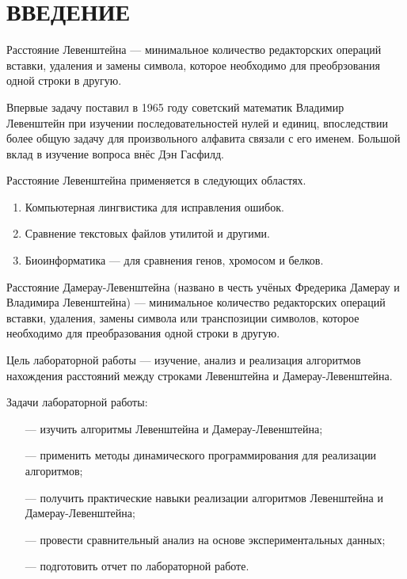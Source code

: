 \chapter*{ВВЕДЕНИЕ}

Расстояние Левенштейна --- минимальное количество редакторских операций вставки, удаления и замены символа, которое необходимо для преобрзования одной строки в другую. 

Впервые задачу поставил в 1965 году советский математик Владимир Левенштейн \cite{Levenshtein} при изучении последовательностей нулей и единиц, впоследствии более общую задачу для произвольного алфавита связали с его именем. Большой вклад в изучение вопроса внёс Дэн Гасфилд.

Расстояние Левенштейна применяется в следующих областях. 
\begin{enumerate}[label={\arabic*)}]
	\item Компьютерная лингвистика для исправления ошибок.
	\item Сравнение текстовых файлов утилитой  и  другими.
	\item Биоинформатика --- для сравнения генов, хромосом и белков.
\end{enumerate}

Расстояние Дамерау-Левенштейна (названо в честь учёных Фредерика Дамерау и Владимира Левенштейна) --- минимальное количество редакторских операций вставки, удаления, замены символа или транспозиции символов, которое необходимо для преобразования одной строки в другую.

Цель лабораторной работы --- изучение, анализ и реализация алгоритмов нахождения расстояний между строками Левенштейна и Дамерау-Левенштейна.

Задачи лабораторной работы:

\begin{itemize}
	\item[---] изучить алгоритмы Левенштейна и Дамерау-Левенштейна;
	\item[---] применить методы динамического программирования для реализации алгоритмов;
	\item[---] получить практические навыки реализации алгоритмов Левенштейна и Дамерау-Левенштейна;
	\item[---] провести сравнительный анализ на основе экспериментальных данных;
	\item[---] подготовить отчет по лабораторной работе.
\end{itemize}

\pagebreak

